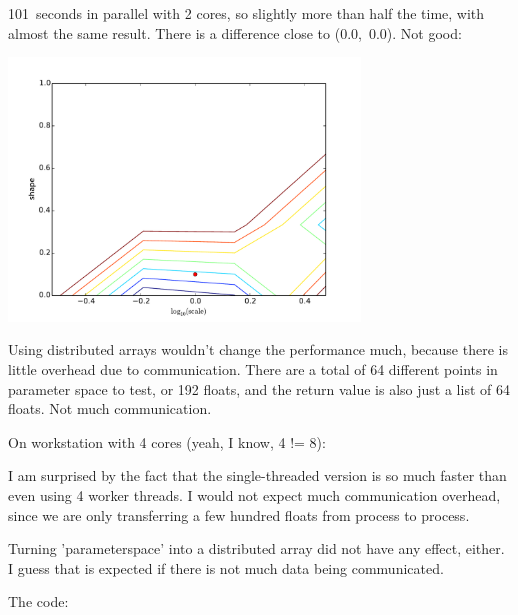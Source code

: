 \documentclass[11pt]{article}
\begin{document}
101~seconds in parallel with 2 cores, so slightly more than half the time, with
almost the same result. There is a difference close to (0.0,~0.0). Not good:
\begin{center}
	\includegraphics[width=0.7\textwidth]{parameterspace_parallel.pdf}
\end{center}

Using distributed arrays wouldn't change the performance much, because there is
little overhead due to communication. There are a total of 64 different points
in parameter space to test, or 192 floats, and the return value is also just a
list of 64 floats. Not much communication.

On workstation with 4 cores (yeah, I know, 4 != 8):
\begin{center}
\end{center}
I am surprised by the fact that the single-threaded version is so much faster
than even using 4 worker threads. I would not expect much communication
overhead, since we are only transferring a few hundred floats from process to
process.

Turning 'parameterspace' into a distributed array did not have any effect,
either. I guess that is expected if there is not much data being communicated.

The code:

\end{document}
